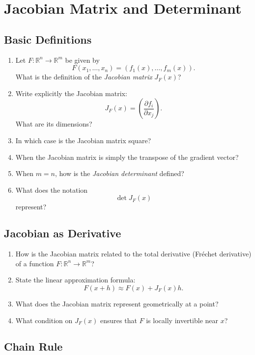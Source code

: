 \section{Jacobian Matrix and Determinant}

\subsection{Basic Definitions}

\begin{enumerate}
  \item Let $F : \mathbb{R}^n \to \mathbb{R}^m$ be given by
    \[
      F(x_1,\dots,x_n) = (f_1(x),\dots,f_m(x)).
    \]
    What is the definition of the \emph{Jacobian matrix} $J_F(x)$?
  \item Write explicitly the Jacobian matrix:
    \[
      J_F(x) = \left( \frac{\partial f_i}{\partial x_j} \right).
    \]
    What are its dimensions?
  \item In which case is the Jacobian matrix square?
  \item When the Jacobian matrix is simply the transpose of the gradient vector?
  \item When $m = n$, how is the \emph{Jacobian determinant} defined?
  \item What does the notation
    \[
      \det J_F(x)
    \]
    represent?
\end{enumerate}

\subsection{Jacobian as Derivative}

\begin{enumerate}[resume]
  \item How is the Jacobian matrix related to the total derivative (Fréchet derivative) of a function $F : \mathbb{R}^n \to \mathbb{R}^m$?
  \item State the linear approximation formula:
    \[
      F(x+h) \approx F(x) + J_F(x)h.
    \]
  \item What does the Jacobian matrix represent geometrically at a point?
  \item What condition on $J_F(x)$ ensures that $F$ is locally invertible near $x$?
\end{enumerate}

\subsection{Chain Rule}

